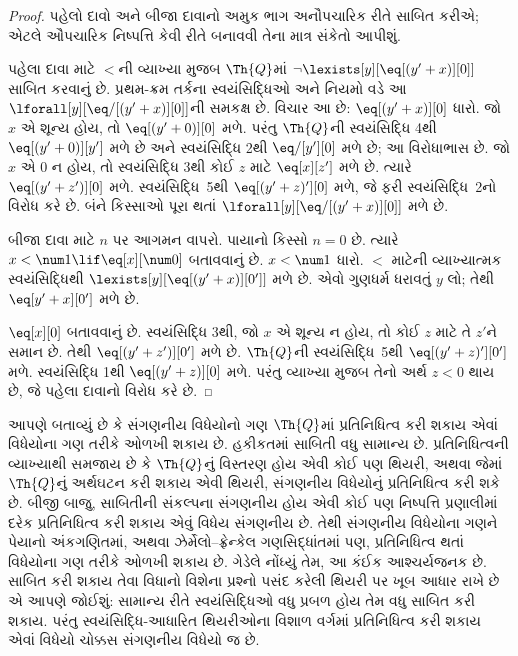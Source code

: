 \begin{proof}
પહેલો દાવો અને બીજા દાવાનો અમુક ભાગ અનૌપચારિક રીતે
સાબિત કરીએ; એટલે ઔપચારિક નિષ્પત્તિ કેવી રીતે
બનાવવી તેના માત્ર સંકેતો આપીશું.

પહેલા દાવા માટે $<$ની વ્યાખ્યા મુજબ $\Th{Q}$માં
$\lnot \lexists[y][\eq[(y'+x)][0]]$ સાબિત કરવાનું છે.
પ્રથમ-ક્રમ તર્કના સ્વયંસિદ્ધિઓ અને નિયમો વડે આ
$\lforall[y][\eq/[(y' + x)][0]]$ની સમકક્ષ છે.
વિચાર આ છે: $\eq[(y'+x)][0]$ ધારો. જો $x$ એ
શૂન્ય હોય, તો $\eq[(y' + 0)][0]$ મળે. પરંતુ
$\Th{Q}$ની સ્વયંસિદ્ધિ 4થી $\eq[(y' + 0)][y']$
મળે છે અને સ્વયંસિદ્ધિ 2થી $\eq/[y'][0]$
મળે છે; આ વિરોધાભાસ છે. જો $x$ એ $0$
ન હોય, તો સ્વયંસિદ્ધિ 3થી કોઈ $z$ માટે
$\eq[x][z']$ મળે છે. ત્યારે
$\eq[(y' + z')][0]$ મળે. સ્વયંસિદ્ધિ~5થી
$\eq[(y' + z)'][0]$ મળે, જે ફરી
સ્વયંસિદ્ધિ~2નો વિરોધ કરે છે. બંને કિસ્સાઓ
પૂરા થતાં $\lforall[y][\eq/[(y' +x)][0]]$ મળે છે.

બીજા દાવા માટે $n$ પર આગમન વાપરો. પાયાનો
કિસ્સો $n =0$ છે. ત્યારે
$x < \num 1 \lif \eq[x][\num 0]$ બતાવવાનું છે.
$x < \num 1$ ધારો. $<$ માટેની વ્યાખ્યાત્મક
સ્વયંસિદ્ધિથી $\lexists[y][\eq[(y'+x)][0']]$
મળે છે. એવો ગુણધર્મ ધરાવતું $y$ લો;
તેથી $\eq[y'+x][0']$ મળે છે.

$\eq[x][0]$ બતાવવાનું છે. સ્વયંસિદ્ધિ 3થી,
જો $x$ એ શૂન્ય ન હોય, તો કોઈ $z$ માટે તે
$z'$ને સમાન છે. તેથી $\eq[(y' + z')][0']$
મળે છે. $\Th{Q}$ની સ્વયંસિદ્ધિ~5થી
$\eq[(y'+z)'][0']$ મળે. સ્વયંસિદ્ધિ 1થી
$\eq[(y' + z)][0]$ મળે. પરંતુ વ્યાખ્યા મુજબ
તેનો અર્થ $z < 0$ થાય છે, જે પહેલા દાવાનો
વિરોધ કરે છે.
\end{proof}

\begin{explain}
આપણે બતાવ્યું છે કે સંગણનીય વિધેયોનો ગણ
$\Th{Q}$માં પ્રતિનિધિત્વ કરી શકાય એવાં
વિધેયોના ગણ તરીકે ઓળખી શકાય છે. હકીકતમાં
સાબિતી વધુ સામાન્ય છે. પ્રતિનિધિત્વની
વ્યાખ્યાથી સમજાય છે કે $\Th{Q}$નું વિસ્તરણ
હોય એવી કોઈ પણ થિયરી, અથવા જેમાં $\Th{Q}$નું
અર્થઘટન કરી શકાય એવી થિયરી, સંગણનીય
વિધેયોનું પ્રતિનિધિત્વ કરી શકે છે. બીજી
બાજુ, સાબિતીની સંકલ્પના સંગણનીય હોય એવી
કોઈ પણ નિષ્પત્તિ પ્રણાલીમાં દરેક
પ્રતિનિધિત્વ કરી શકાય એવું વિધેય
સંગણનીય છે. તેથી સંગણનીય વિધેયોના
ગણને પેયાનો અંકગણિતમાં, અથવા ઝેર્મેલો--ફ્રેન્કેલ
ગણસિદ્ધાંતમાં પણ, પ્રતિનિધિત્વ થતાં
વિધેયોના ગણ તરીકે ઓળખી શકાય છે.
ગેડેલે નોંધ્યું તેમ, આ કંઈક આશ્ચર્યજનક છે.
સાબિત કરી શકાય તેવા વિધાનો વિશેના પ્રશ્નો
પસંદ કરેલી થિયરી પર ખૂબ આધાર રાખે છે
એ આપણે જોઈશું: સામાન્ય રીતે સ્વયંસિદ્ધિઓ
વધુ પ્રબળ હોય તેમ વધુ સાબિત કરી શકાય.
પરંતુ સ્વયંસિદ્ધિ-આધારિત થિયરીઓના
વિશાળ વર્ગમાં પ્રતિનિધિત્વ કરી શકાય
એવાં વિધેયો ચોક્કસ સંગણનીય વિધેયો જ છે.
\end{explain}
\endgroup

